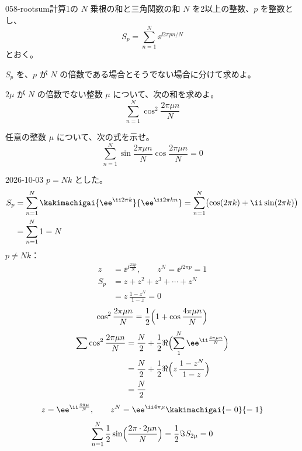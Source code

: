 \documentclass[uplatex,dvipdfmx,a4paper,11pt]{jsarticle}
\begin{document}
\begin{mondai}{058-rootsum}{計算}{1の $N$ 乗根の和と三角関数の和}
$N$ を2以上の整数、$p$ を整数とし、
\[
S_p=\sum_{n=1}^{N}\ee^{\ii 2\pi pn/N}
\]
とおく。
\begin{shoumon}
  \item $S_p$ を、$p$ が $N$ の倍数である場合とそうでない場合に分けて求めよ。
  \item $2\mu$ が $N$ の倍数でない整数 $\mu$ について、次の和を求めよ。
\[
\sum_{n=1}^{N}\cos^{2}\frac{2\pi\mu n}{N}
\]
  \item 任意の整数 $\mu$ について、次の式を示せ。
\[
\sum_{n=1}^{N}\sin\frac{2\pi\mu n}{N}\cos\frac{2\pi\mu n}{N}=0
\]
\end{shoumon}
\begin{kotaeutsushi}{2026-10-03}
$p=Nk$ とした。
\begin{align*}
  S_p&=\sum_{n=1}^{N}\kakimachigai{\ee^{\ii2\pi k}}{\ee^{\ii2\pi kn}}=\sum_{n=1}^{N}\bigl(\cos(2\pi k)+\ii\sin(2\pi k)\bigr)\\
  &=\sum_{n=1}^{N}1=N
\end{align*}
$p\neq Nk$：
\begin{align*}
  z&=\ee^{\ii\frac{2\pi p}{N}},\qquad z^{N}=\ee^{\ii2\pi p}=1\\
  S_p&=z+z^{2}+z^{3}+\cdots+z^{N}\\
  &=z\,\frac{1-z^{N}}{1-z}=0
\end{align*}
\[
  \cos^{2}\frac{2\pi\mu n}{N}=\frac{1}{2}\Bigl(1+\cos\frac{4\pi\mu n}{N}\Bigr)
\]
\begin{align*}
  \sum\cos^{2}\frac{2\pi\mu n}{N}&=\frac{N}{2}+\frac{1}{2}\Re\Bigl(\sum_{1}^{N}\ee^{\ii\frac{4\pi\mu n}{N}}\Bigr)\\
  &=\frac{N}{2}+\frac{1}{2}\Re\Bigl(z\,\frac{1-z^{N}}{1-z}\Bigr)\\
  &=\frac{N}{2}
\end{align*}
\[
  z=\ee^{\ii\frac{4\pi\mu}{N}},\qquad z^{N}=\ee^{\ii4\pi\mu}\kakimachigai{=0}{=1}
\]
\[
  \sum_{n=1}^{N}\frac{1}{2}\sin\Bigl(\frac{2\pi\cdot2\mu n}{N}\Bigr)=\frac{1}{2}\Im S_{2\mu}=0
\]
\end{kotaeutsushi}
\end{mondai}
\end{document}

